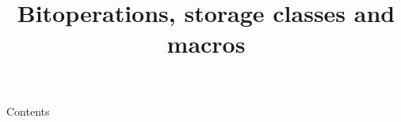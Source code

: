 
\newcommand{\topic}{
	Bitoperations, storage classes and macros
}

\title{\topic}
\supertitle{\course}
\date{}



\maketitle

\begin{frame}{Contents}
	\tableofcontents
\end{frame}



